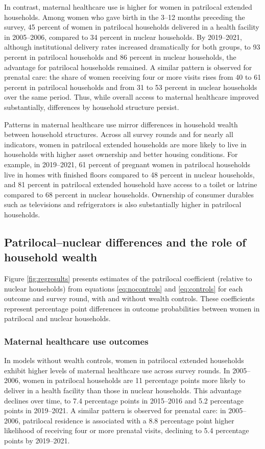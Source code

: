 \documentclass[12pt]{article}
\begin{document}
In contrast, maternal healthcare use is higher for women in patrilocal extended households. Among women who gave birth in the 3–12 months preceding the survey, 45 percent of women in patrilocal households delivered in a health facility in 2005–2006, compared to 34 percent in nuclear households. By 2019–2021, although institutional delivery rates increased dramatically for both groups, to 93 percent in patrilocal households and 86 percent in nuclear households, the advantage for patrilocal households remained. A similar pattern is observed for prenatal care: the share of women receiving four or more visits rises from 40 to 61 percent in patrilocal households and from 31 to 53 percent in nuclear households over the same period. Thus, while overall access to maternal healthcare improved substantially, differences by household structure persist.

Patterns in maternal healthcare use mirror differences in household wealth between household structures. Across all survey rounds and for nearly all indicators, women in patrilocal extended households are more likely to live in households with higher asset ownership and better housing conditions. For example, in 2019–2021, 61 percent of pregnant women in patrilocal households live in homes with finished floors compared to 48 percent in nuclear households, and 81 percent in patrilocal extended household have access to a toilet or latrine compared to 68 percent in nuclear households. Ownership of consumer durables such as televisions and refrigerators is also substantially higher in patrilocal households.


\subsection{Patrilocal–nuclear differences and the role of household wealth}

Figure \ref{fig:regresults} presents estimates of the patrilocal coefficient (relative to nuclear households) from equations \ref{eq:nocontrols} and \ref{eq:controls} for each outcome and survey round, with and without wealth controls. These coefficients represent percentage point differences in outcome probabilities between women in patrilocal and nuclear households.

\subsubsection{ Maternal healthcare use outcomes}

In models without wealth controls, women in patrilocal extended households exhibit higher levels of maternal healthcare use across survey rounds. In 2005–2006, women in patrilocal households are 11 percentage points more likely to deliver in a health facility than those in nuclear households. This advantage declines over time, to 7.4 percentage points in 2015–2016 and 5.2 percentage points in 2019–2021. A similar pattern is observed for prenatal care: in 2005–2006, patrilocal residence is associated with a 8.8 percentage point higher likelihood of receiving four or more prenatal visits, declining to 5.4 percentage points by 2019–2021.
\end{document}
